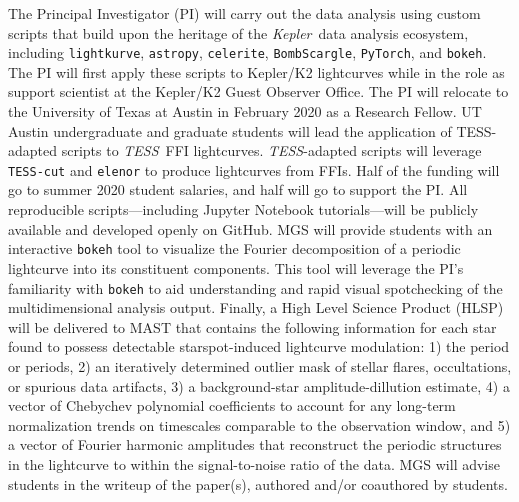 \documentclass[letterpaper,11pt]{article}
\newcommand{\tess}{{\it TESS}}
\newcommand{\kepler}{{\it Kepler}}
\begin{document}
The Principal Investigator (PI) will carry out the data analysis using custom scripts that build upon the heritage of the \kepler\ data analysis ecosystem, including \texttt{lightkurve}, \texttt{astropy}, \texttt{celerite}, \texttt{BombScargle}, \texttt{PyTorch}, and \texttt{bokeh}.  The PI will first apply these scripts to Kepler/K2 lightcurves while in the role as support scientist at the Kepler/K2 Guest Observer Office.  The PI will relocate to the University of Texas at Austin in February 2020 as a Research Fellow.  UT Austin undergraduate and graduate students will lead the application of TESS-adapted scripts to \tess\ FFI lightcurves.  \tess-adapted scripts will leverage \texttt{TESS-cut} and \texttt{elenor} to produce lightcurves from FFIs.  Half of the funding will go to summer 2020 student salaries, and half will go to support the PI.  All reproducible scripts---including Jupyter Notebook tutorials---will be publicly available and developed openly on GitHub.  MGS will provide students with an interactive \texttt{bokeh} tool to visualize the Fourier decomposition of a periodic lightcurve into its constituent components.  This tool will leverage the PI's familiarity with \texttt{bokeh} to aid understanding and rapid visual spotchecking of the multidimensional analysis output.  Finally, a High Level Science Product (HLSP) will be delivered to MAST that contains the following information for each star found to possess detectable starspot-induced lightcurve modulation: 1) the period or periods, 2) an iteratively determined outlier mask of stellar flares, occultations, or spurious data artifacts, 3) a background-star amplitude-dillution estimate, 4) a vector of Chebychev polynomial coefficients to account for any long-term normalization trends on timescales comparable to the observation window, and 5) a vector of Fourier harmonic amplitudes that reconstruct the periodic structures in the lightcurve to within the signal-to-noise ratio of the data.  MGS will advise students in the writeup of the paper(s), authored and/or coauthored by students.


\end{document}
